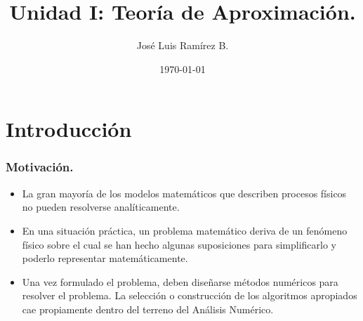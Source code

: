 \documentclass{beamer}
\title{Unidad I: Teor\'ia de Aproximaci\'on.}
\author{Jos\'e Luis Ram\'irez B.}
\date{\today}
\begin{document}
\frame{\titlepage}

\frame{\tableofcontents}

\section{Introducci\'on}
\begin{frame}[fragile]
  \frametitle{Motivaci\'on.} 
  \begin{itemize}
    \item<1-> La gran mayor\'ia de los modelos matem\'aticos que describen procesos f\'isicos no pueden resolverse anal\'iticamente.
    \item<2-> En una situaci\'on pr\'actica, un problema matem\'atico deriva de un fen\'omeno f\'isico sobre el cual se han hecho algunas suposiciones para simplificarlo y poderlo representar matem\'aticamente.
    \item<3-> Una vez formulado el problema, deben dise\~narse m\'etodos num\'ericos para resolver el problema. La selecci\'on o construcci\'on de los algoritmos apropiados cae propiamente dentro del terreno del An\'alisis Num\'erico.
  \end{itemize}    
\end{frame}
\end{document}
